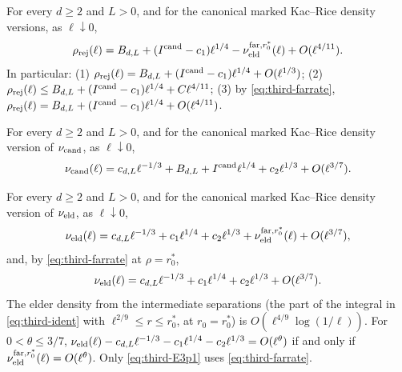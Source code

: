 \begin{corollary}\label{cor:third-E3prime}
For every $d\ge2$ and $L>0$, and for the canonical marked Kac--Rice density versions, as $\ell\downarrow0$,
\begin{equation}\label{eq:third-rej0}
\rho_{\mathrm{rej}}(\ell)=B_{d,L}+(I^{\mathrm{cand}}-c_1)\ell^{1/4}-\nu_{\mathrm{eld}}^{{\rm far},r_0^*}(\ell)+O(\ell^{4/11}).
\end{equation}
In particular: (1) $\rho_{\mathrm{rej}}(\ell)=B_{d,L}+(I^{\mathrm{cand}}-c_1)\ell^{1/4}+O(\ell^{1/3})$; (2) $\rho_{\mathrm{rej}}(\ell)\le B_{d,L}+(I^{\mathrm{cand}}-c_1)\ell^{1/4}+C\ell^{4/11}$; (3) by \eqref{eq:third-farrate}, $\rho_{\mathrm{rej}}(\ell)=B_{d,L}+(I^{\mathrm{cand}}-c_1)\ell^{1/4}+O(\ell^{4/11})$.
\end{corollary}

\begin{theorem}\label{thm:third-Tplus}
For every $d\ge2$ and $L>0$, and for the canonical marked Kac--Rice density version of $\nu_{\mathrm{cand}}$, as $\ell\downarrow0$,
\begin{equation}\label{eq:third-Tp}
\nu_{\mathrm{cand}}(\ell)=c_{d,L}\ell^{-1/3}+B_{d,L}+I^{\mathrm{cand}}\ell^{1/4}+c_2\ell^{1/3}+O(\ell^{3/7}).
\end{equation}
\end{theorem}

\begin{theorem}\label{thm:third-E3plus}
For every $d\ge2$ and $L>0$, and for the canonical marked Kac--Rice density version of $\nu_{\mathrm{eld}}$, as $\ell\downarrow0$,
\begin{equation}\label{eq:third-E3p0}
\nu_{\mathrm{eld}}(\ell)=c_{d,L}\ell^{-1/3}+c_1\ell^{1/4}+c_2\ell^{1/3}+\nu_{\mathrm{eld}}^{{\rm far},r_0^*}(\ell)+O(\ell^{3/7}),
\end{equation}
and, by \eqref{eq:third-farrate} at $\rho=r_0^*$,
\begin{equation}\label{eq:third-E3p1}
\nu_{\mathrm{eld}}(\ell)=c_{d,L}\ell^{-1/3}+c_1\ell^{1/4}+c_2\ell^{1/3}+O(\ell^{3/7}).
\end{equation}
The elder density from the intermediate separations (the part of the integral in \eqref{eq:third-ident} with $\ell^{2/9}\le r\le r_0^*$, at $r_0=r_0^*$) is $O(\ell^{4/9}\log(1/\ell))$. For $0<\theta\le3/7$, $\nu_{\mathrm{eld}}(\ell)-c_{d,L}\ell^{-1/3}-c_1\ell^{1/4}-c_2\ell^{1/3}=O(\ell^\theta)$ if and only if $\nu^{{\rm far},r_0^*}_{\mathrm{eld}}(\ell)=O(\ell^\theta)$. Only \eqref{eq:third-E3p1} uses \eqref{eq:third-farrate}.
\end{theorem}

